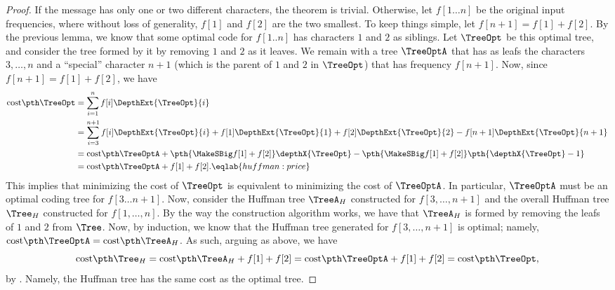\begin{proof}
    If the message has only one or two different characters, the
    theorem is trivial.  Otherwise, let $f[1 \ldots n]$ be the
    original input frequencies, where without loss of generality,
    $f[1]$ and $f[2]$ are the two smallest. To keep things simple, let
    $f[n + 1] = f[1] + f[2]$. By the previous lemma, we know that some
    optimal code for $f[1 .. n]$ has characters $1$ and $2$ as
    siblings. Let $\TreeOpt$ be this optimal tree, and consider the
    tree formed by it by removing $1$ and $2$ as it leaves. We remain
    with a tree $\TreeOptA$ that has as leafs the characters
    $3,\ldots, n$ and a ``special'' character $n+1$ (which is the
    parent of $1$ and $2$ in $\TreeOpt$) that has frequency
    $f[n+1]$. Now, since $f[n+1] = f[1] + f[2]$, we have
    \begin{align}
        \costX{\TreeOpt} &= \sum_{i=1}^n f[i] \DepthExt{\TreeOpt}{i} \nonumber\\
        &= \sum_{i=3}^{n+1} f[i] \DepthExt{\TreeOpt}{i} + f[1]
        \DepthExt{\TreeOpt}{1} + f[2] \DepthExt{\TreeOpt}{2} - f[n+1]
        \DepthExt{\TreeOpt}{n+1} \nonumber\\
        &= \costX{\TreeOptA} + \pth{\MakeSBig f[1] + f[2] }
        \depthX{\TreeOpt} - \pth{\MakeSBig f[1] + f[2]
        } \pth{\depthX{\TreeOpt}-1} \nonumber\\
        &= \costX{\TreeOptA} + f[1] + f[2]. %
        \eqlab{huffman:price}
    \end{align}
    This implies that minimizing the cost of $\TreeOpt$ is equivalent
    to minimizing the cost of $\TreeOptA$. In particular, $\TreeOptA$
    must be an optimal coding tree for $f[3\ldots n+1]$. Now, consider
    the Huffman tree $\TreeA_H$ constructed for $f[3, \ldots, n+1]$
    and the overall Huffman tree $\Tree_H$ constructed for
    $f[1, \ldots, n]$. By the way the construction algorithm works, we
    have that $\TreeA_H$ is formed by removing the leafs of $1$ and
    $2$ from $\Tree$.  Now, by induction, we know that the Huffman
    tree generated for $f[3, \ldots, n+1]$ is optimal; namely,
    $\costX{\TreeOptA} = \costX{\TreeA_H}$.  As such, arguing as
    above, we have
    \begin{equation*}
    \costX{\Tree_H} = \costX{\TreeA_H} + f[1] + f[2] =
    \costX{\TreeOptA} + f[1] + f[2] = \costX{\TreeOpt},
    \end{equation*}
    by .  Namely, the Huffman tree has the same
    cost as the optimal tree.
\end{proof}


